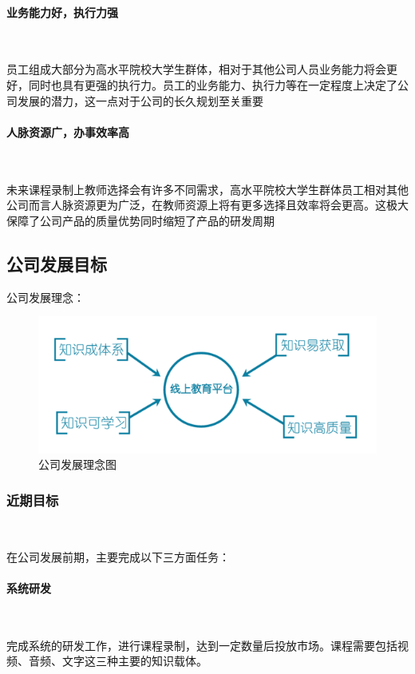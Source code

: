 \paragraph{业务能力好，执行力强}\

员工组成大部分为高水平院校大学生群体，相对于其他公司人员业务能力将会更好，同时也具有更强的执行力。员工的业务能力、执行力等在一定程度上决定了公司发展的潜力，这一点对于公司的长久规划至关重要

\paragraph{人脉资源广，办事效率高}\

未来课程录制上教师选择会有许多不同需求，高水平院校大学生群体员工相对其他公司而言人脉资源更为广泛，在教师资源上将有更多选择且效率将会更高。这极大保障了公司产品的质量优势同时缩短了产品的研发周期

\subsection{公司发展目标}
公司发展理念：
\begin{figure}[H]
	\centering
	\includegraphics[width=0.9\columnwidth]{figures/company_development}%
	\caption{公司发展理念图}
	\label{fg:company_development}
\end{figure}

\subsubsection{近期目标}\

在公司发展前期，主要完成以下三方面任务：
\paragraph{系统研发}\

完成系统的研发工作，进行课程录制，达到一定数量后投放市场。课程需要包括视频、音频、文字这三种主要的知识载体。

